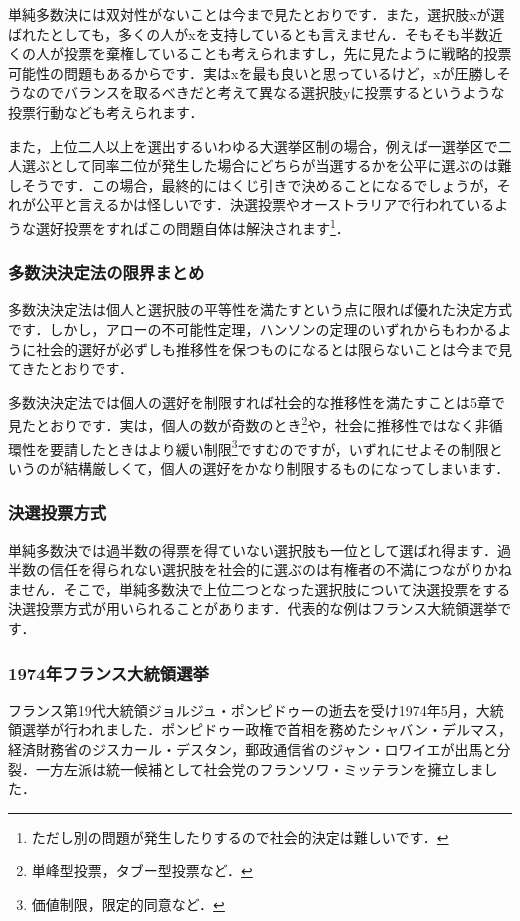 単純多数決には双対性がないことは今まで見たとおりです．また，選択肢xが選ばれたとしても，多くの人がxを支持しているとも言えません．そもそも半数近くの人が投票を棄権していることも考えられますし，先に見たように戦略的投票可能性の問題もあるからです．実はxを最も良いと思っているけど，xが圧勝しそうなのでバランスを取るべきだと考えて異なる選択肢yに投票するというような投票行動なども考えられます．

また，上位二人以上を選出するいわゆる大選挙区制の場合，例えば一選挙区で二人選ぶとして同率二位が発生した場合にどちらが当選するかを公平に選ぶのは難しそうです．この場合，最終的にはくじ引きで決めることになるでしょうが，それが公平と言えるかは怪しいです．決選投票やオーストラリアで行われているような選好投票をすればこの問題自体は解決されます\footnote{ただし別の問題が発生したりするので社会的決定は難しいです．}．

\subsubsection*{多数決決定法の限界まとめ}
多数決決定法は個人と選択肢の平等性を満たすという点に限れば優れた決定方式です．しかし，アローの不可能性定理，ハンソンの定理のいずれからもわかるように社会的選好が必ずしも推移性を保つものになるとは限らないことは今まで見てきたとおりです．

多数決決定法では個人の選好を制限すれば社会的な推移性を満たすことは5章で見たとおりです．実は，個人の数が奇数のとき\footnote{単峰型投票，タブー型投票など．}や，社会に推移性ではなく非循環性を要請したときはより緩い制限\footnote{価値制限，限定的同意など．}ですむのですが，いずれにせよその制限というのが結構厳しくて，個人の選好をかなり制限するものになってしまいます．

\subsubsection*{決選投票方式}
単純多数決では過半数の得票を得ていない選択肢も一位として選ばれ得ます．過半数の信任を得られない選択肢を社会的に選ぶのは有権者の不満につながりかねません．そこで，単純多数決で上位二つとなった選択肢について決選投票をする決選投票方式が用いられることがあります．代表的な例はフランス大統領選挙です．

\subsubsection*{1974年フランス大統領選挙}
フランス第19代大統領ジョルジュ・ポンピドゥーの逝去を受け1974年5月，大統領選挙が行われました．ポンピドゥー政権で首相を務めたシャバン・デルマス，経済財務省のジスカール・デスタン，郵政通信省のジャン・ロワイエが出馬と分裂．一方左派は統一候補として社会党のフランソワ・ミッテランを擁立しました．

